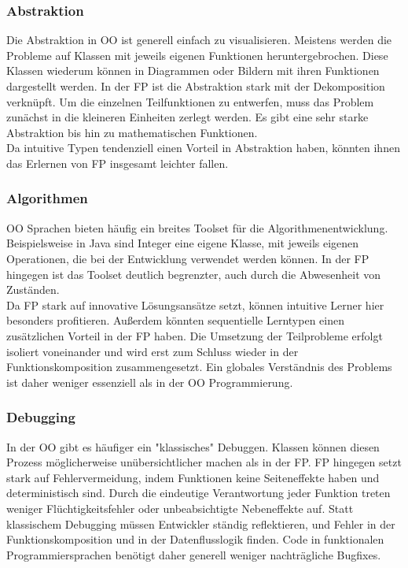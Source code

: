 \subsubsection{Abstraktion}
Die Abstraktion in OO ist generell einfach zu visualisieren. Meistens werden die Probleme auf Klassen mit jeweils eigenen Funktionen heruntergebrochen. Diese Klassen wiederum können in Diagrammen oder Bildern mit ihren Funktionen dargestellt werden.
In der FP ist die Abstraktion stark mit der Dekomposition verknüpft. Um die einzelnen Teilfunktionen zu entwerfen, muss das Problem zunächst in die kleineren Einheiten zerlegt werden.
Es gibt eine sehr starke Abstraktion bis hin zu mathematischen Funktionen.
\\
Da intuitive Typen tendenziell einen Vorteil in Abstraktion haben, könnten ihnen das Erlernen von FP insgesamt leichter fallen.

\subsubsection{Algorithmen}
OO Sprachen bieten häufig ein breites Toolset für die Algorithmenentwicklung. Beispielsweise in Java sind Integer eine eigene Klasse, mit jeweils eigenen Operationen, die bei der Entwicklung verwendet werden können. In der FP hingegen ist das Toolset deutlich begrenzter, auch durch die Abwesenheit von Zuständen.
\\
Da FP stark auf innovative Lösungsansätze setzt, können intuitive Lerner hier besonders profitieren.
Außerdem könnten sequentielle Lerntypen einen zusätzlichen Vorteil in der FP haben. Die Umsetzung der Teilprobleme erfolgt isoliert voneinander und wird erst zum Schluss wieder in der Funktionskomposition zusammengesetzt. Ein globales Verständnis des Problems ist daher weniger essenziell als in der OO Programmierung.

\subsubsection{Debugging}
In der OO gibt es häufiger ein "klassisches" Debuggen. Klassen können diesen Prozess möglicherweise unübersichtlicher machen als in der FP. FP hingegen setzt stark auf Fehlervermeidung, indem Funktionen keine Seiteneffekte haben und deterministisch sind. Durch die eindeutige Verantwortung jeder Funktion treten weniger Flüchtigkeitsfehler oder unbeabsichtigte Nebeneffekte auf. Statt klassischem Debugging müssen Entwickler ständig reflektieren, und Fehler in der Funktionskomposition und in der Datenflusslogik finden.
Code in funktionalen Programmiersprachen benötigt daher generell weniger nachträgliche Bugfixes.


